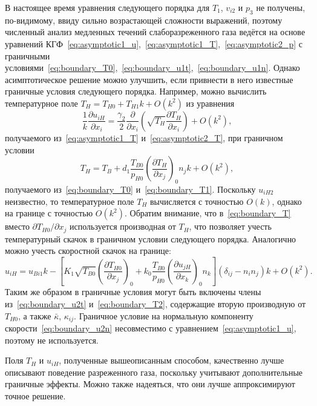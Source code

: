 \documentclass[
aps,%
12pt,%
final,%
notitlepage,%
oneside,%
onecolumn,%
nobibnotes,%
nofootinbib,%
superscriptaddress,%
noshowpacs,%
showkeys,%
tightenlines,%
centertags]%
{revtex4}
\newcommand{\pder}[2][]{\frac{\partial#1}{\partial#2}}
\newcommand{\Pder}[2][]{\partial#1/\partial#2}
\newcommand{\OO}[1]{O(#1)}
\newcommand{\onwall}[1]{\left(#1\right)_0}
\begin{document}
В настоящее время уравнения следующего порядка для \(T_1\), \(v_{i2}\) и \(p_3\)
не получены, по-видимому, ввиду сильно возрастающей сложности выражений,
поэтому численный анализ медленных течений слаборазреженного газа ведётся
на основе уравнений КГФ~\eqref{eq:asymptotic1_u},~\eqref{eq:asymptotic1_T},~\eqref{eq:asymptotic2_p}
с граничными условиями~\eqref{eq:boundary_T0},~\eqref{eq:boundary_u1t},~\eqref{eq:boundary_u1n}.
Однако асимптотическое решение можно улучшить,
если привнести в него известные граничные условия следующего порядка.
Например, можно вычислить температурное поле \(T_H = T_{H0} + T_{H1}k + \OO{k^2}\) из уравнения
\begin{equation}\label{eq:asymptotic_T}
    \frac1k\pder[u_{iH}]{x_i} = \frac{\gamma_2}2\pder{x_i}\left(\sqrt{T_H}\pder[T_H]{x_i}\right) + \OO{k^2},
\end{equation}
получаемого из~\eqref{eq:asymptotic1_T} и~\eqref{eq:asymptotic2_T},
при граничном условии
\begin{equation}\label{eq:boundary_T}
    T_H = T_B + d_1\frac{T_{B0}}{p_{H0}}\onwall{\pder[T_H]{x_j}}n_j k + \OO{k^2},
\end{equation}
получаемого из~\eqref{eq:boundary_T0} и~\eqref{eq:boundary_T1}.
Поскольку \(u_{iH2}\) неизвестно, то температурное поле \(T_H\) вычисляется с точностью \(\OO{k}\),
однако на границе с точностью \(\OO{k^2}\).
Обратим внимание, что в~\eqref{eq:boundary_T} вместо \(\Pder[T_{H0}]{x_j}\) используется производная от \(T_H\),
что позволяет учесть температурный скачок в граничном условии следующего порядка.
Аналогично можно учесть скоростной скачок на границе:
\begin{equation}\label{eq:boundary_u}
    u_{iH} = u_{Bi1}k - \left[ K_1\sqrt{T_{B0}}\onwall{\pder[T_{H0}]{x_j}}
        + k_0\frac{T_{B0}}{p_{H0}}\onwall{\pder[u_{jH}]{x_k}}n_k \right] (\delta_{ij}-n_i n_j)k + \OO{k^2}.
\end{equation}
Таким же образом в граничные условия могут быть включены члены из~\eqref{eq:boundary_u2t} и~\eqref{eq:boundary_T2},
содержащие вторую производную от \(T_{H0}\), а также \(\bar\kappa\), \(\kappa_{ij}\).
Граничное условие на нормальную компоненту скорости~\eqref{eq:boundary_u2n}
несовместимо с уравнением~\eqref{eq:asymptotic1_u}, поэтому не используется.

Поля \(T_H\) и \(u_{iH}\), полученные вышеописанным способом,
качественно лучше описывают поведение разреженного газа,
поскольку учитывают дополнительные граничные эффекты.
Можно также надеяться, что они лучше аппроксимируют точное решение.
\end{document}
